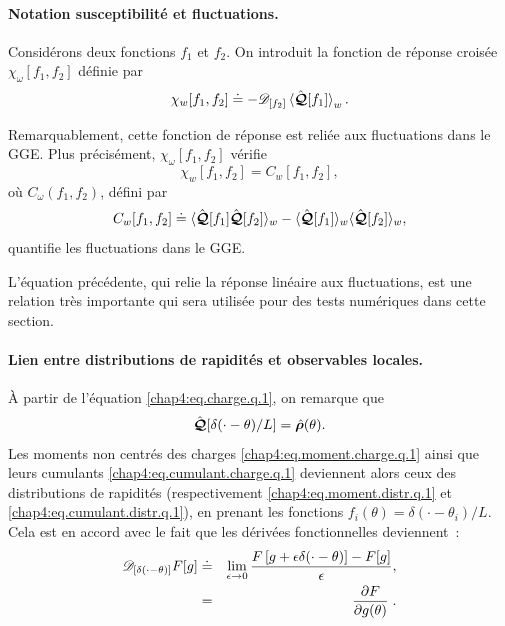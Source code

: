 \paragraph{Notation susceptibilité et fluctuations.}

Considérons deux fonctions $f_1$ et $f_2$. On introduit la fonction de réponse croisée $\chi_\omega[f_1, f_2]$ définie par
\begin{equation}\label{chap4:eq.susceptibilite-fonctionnelle_2}
	\chi_w[f_1, f_2] \doteq - \mathscr{D}_{[f_2]}  \braket{\hat{\bm{\mathcal{Q}}}[f_1]}_w.
\end{equation}

Remarquablement, cette fonction de réponse est reliée aux fluctuations dans le GGE. Plus précisément, $\chi_\omega[f_1, f_2]$ vérifie
\begin{equation}\label{chap4:eq.suscep.corre.1}
	\chi_w[f_1, f_2] = C_w[f_1, f_2],
\end{equation}
où $C_\omega(f_1, f_2)$, défini par
\begin{equation}\label{chap4:eq.corre.1}
C_w[f_1, f_2] \doteq \langle \hat{\bm{\mathcal{Q}}}[f_1] \hat{\bm{\mathcal{Q}}}[f_2] \rangle_w - \langle \hat{\bm{\mathcal{Q}}}[f_1] \rangle_w \langle \hat{\bm{\mathcal{Q}}}[f_2] \rangle_w,
\end{equation}
quantifie les fluctuations dans le GGE.

L'équation précédente, qui relie la réponse linéaire aux fluctuations, est une relation très importante qui sera utilisée pour des tests numériques dans cette section.

\paragraph{Lien entre distributions de rapidités et observables locales.}

À partir de l’équation \eqref{chap4:eq.charge.q.1}, on remarque que 
\begin{eqnarray}
	\hat{\bm{\mathcal{Q}}}[\delta(\cdot - \theta)/L] = \hat{\bm{\rho}}(\theta).
\end{eqnarray}
Les moments non centrés des charges \eqref{chap4:eq.moment.charge.q.1} ainsi que leurs cumulants \eqref{chap4:eq.cumulant.charge.q.1} deviennent alors ceux des distributions de rapidités (respectivement \eqref{chap4:eq.moment.distr.q.1} et \eqref{chap4:eq.cumulant.distr.q.1}), en prenant les fonctions $f_i(\theta) = \delta(\cdot - \theta_i)/L$.\\

Cela est en accord avec le fait que les dérivées fonctionnelles deviennent :
\begin{eqnarray}\label{chap4:eq.w_fi_dif_0}
	\mathscr{D}_{[\delta(\cdot - \theta)]} F[g] &\doteq& \lim_{\epsilon \to 0} \frac{F\left[g + \epsilon \delta(\cdot - \theta)\right] - F[g]}{\epsilon}, \\
	& = & \left. \frac{\partial F}{\partial g(\theta)} \right. .
\end{eqnarray}



